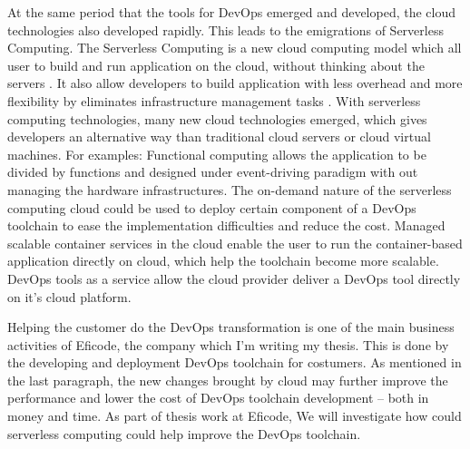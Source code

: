 \par
At the same period that the tools for DevOps emerged and developed, the cloud technologies also developed rapidly. This leads to the emigrations of Serverless Computing. 
The Serverless Computing is a new cloud computing model which all user to build and run application on the cloud, without thinking about the servers \cite{Serverle81:online}. It also allow developers to build application with less overhead \cite{Serverle81:online} and more flexibility by eliminates infrastructure management tasks \cite{Serverle73:online}.
With serverless computing technologies, many new cloud technologies emerged, which gives developers an alternative way than traditional cloud servers or cloud virtual machines. For examples: Functional computing allows the application to be divided by functions and designed under event-driving paradigm with out managing the hardware infrastructures. The on-demand nature of the serverless computing cloud could be used to deploy certain component of a DevOps toolchain to ease the implementation difficulties and reduce the cost. Managed scalable container services in the cloud enable the user to run the container-based application directly on cloud, which help the toolchain become more scalable. DevOps tools as a service \cite{DevOpsas45:online} allow the cloud provider deliver a DevOps tool directly on it's cloud platform.
\par
Helping the customer do the DevOps transformation is one of the main business activities of Eficode, the company which I'm writing my thesis. This is done by the developing and deployment DevOps toolchain for costumers. As mentioned in the last paragraph, the new changes brought by cloud may further improve the performance and lower the cost of DevOps toolchain development -- both in money and time. As part of thesis work at Eficode, We will investigate how could serverless computing could help improve the DevOps toolchain. 
